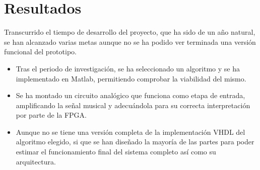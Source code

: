 \section{Resultados}
Transcurrido el tiempo de desarrollo del proyecto, que ha sido de un año natural, se han alcanzado varias metas aunque no se ha podido ver terminada una versión funcional del prototipo. 
\begin{itemize}
\item Tras el periodo de investigación, se ha seleccionado un algoritmo y se ha implementado en Matlab, permitiendo comprobar la viabilidad del mismo. 
\item Se ha montado un circuito analógico que funciona como etapa de entrada, amplificando la señal musical y adecuándola para su correcta interpretación por parte de la FPGA.
\item Aunque no se tiene una versión completa de la implementación VHDL del algoritmo elegido, si que se han diseñado la mayoría de las partes para poder estimar el funcionamiento final del sistema completo así como su arquitectura.
\end{itemize}

